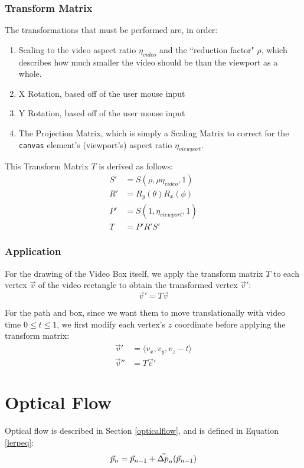 \subsubsection{Transform Matrix}
The transformations that must be performed are, in order:
\begin{enumerate}
    \item Scaling to the video aspect ratio $\eta_{video}$ and the ``reduction factor" $\rho$, which describes how much smaller the video should be than the viewport as a whole.
    \item X Rotation, based off of the user mouse input
    \item Y Rotation, based off of the user mouse input
    \item The Projection Matrix, which is simply a Scaling Matrix to correct for the \texttt{canvas} element's (viewport's) aspect ratio $\eta_{viewport}$.
\end{enumerate}
This Transform Matrix $T$ is derived as follows:
\begin{align}
    S' & = S(\rho, \rho \eta_{video}, 1) \\
    R' & = R_y(\theta) R_x(\phi) \\
    P' & = S(1, \eta_{viewport}, 1) \\
    T & = P' R' S'
\end{align}

\subsubsection{Application}
For the drawing of the Video Box itself, we apply the transform matrix $T$ to each vertex $\vec{v}$ of the video rectangle to obtain the transformed vertex $\vec{v}'$:
\begin{equation}
    \vec{v}' = T \vec{v}
\end{equation}
\par For the path and box, since we want them to move translationally with video time $0 \leq t \leq 1$, we first modify each vertex's $z$ coordinate before applying the transform matrix:
\begin{align}
    \vec{v}' & = \langle v_x, v_y, v_z - t \rangle \\
    \vec{v}'' & = T \vec{v}'
\end{align}

\section{Optical Flow}
Optical flow is described in Section \ref{opticalflow}, and is defined in Equation \ref{lerpeq}:
\begin{equation}
\label{lerpeq}
    \vec{p}_n = \vec{p}_{n-1} + \vec{\Delta p}_n(\vec{p}_{n-1}) \\
\end{equation}

